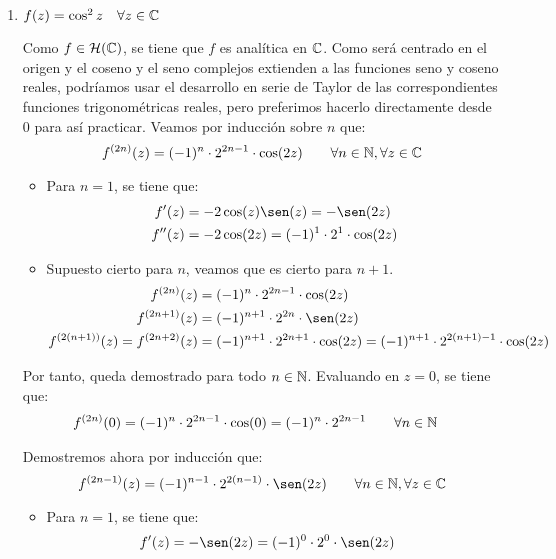 \begin{ejercicio}
\begin{enumerate}
        

        
        \item $f(z) = \cos^2 z \quad \forall z \in \mathbb{C}$
        
        Como $f\in \mathcal{H}(\mathbb{C})$, se tiene que $f$ es analítica en $\mathbb{C}$. Como será centrado en el origen y el coseno y el seno complejos extienden a las funciones seno y coseno reales, podríamos usar el desarrollo en serie de Taylor de las correspondientes funciones trigonométricas reales, pero preferimos hacerlo directamente desde $0$ para así practicar.        
        Veamos por inducción sobre $n$ que:
        \begin{equation*}
            f^{(2n)}(z) = (-1)^{n}\cdot 2^{2n-1}\cdot \cos(2z) \qquad \forall n \in \mathbb{N}, \forall z \in \mathbb{C}
        \end{equation*}
        \begin{itemize}
            \item Para $n=1$, se tiene que:
            \begin{align*}
                f'(z) &= -2\cos(z)\sen(z) = -\sen(2z)\\
                f''(z) &= -2\cos(2z) = (-1)^1\cdot 2^{1}\cdot \cos(2z)
            \end{align*}

            \item Supuesto cierto para $n$, veamos que es cierto para $n+1$.
            \begin{align*}
                f^{(2n)}(z) &= (-1)^{n}\cdot 2^{2n-1}\cdot \cos(2z)\\
                f^{(2n+1)}(z) &= (-1)^{n+1}\cdot 2^{2n}\cdot \sen(2z)\\
                f^{(2(n+1))}(z) = f^{(2n+2)}(z) &= (-1)^{n+1}\cdot 2^{2n+1}\cdot \cos(2z) = (-1)^{n+1}\cdot 2^{2(n+1)-1}\cdot \cos(2z)
            \end{align*}
        \end{itemize}

        Por tanto, queda demostrado para todo $n\in \mathbb{N}$. Evaluando en $z=0$, se tiene que:
        \begin{align*}
            f^{(2n)}(0) &= (-1)^{n}\cdot 2^{2n-1}\cdot \cos(0) = (-1)^{n}\cdot 2^{2n-1}\qquad \forall n \in \mathbb{N}
        \end{align*}

        Demostremos ahora por inducción que:
        \begin{equation*}
            f^{(2n-1)}(z) = (-1)^{n-1}\cdot 2^{2(n-1)}\cdot \sen(2z) \qquad \forall n \in \bb{N}, \forall z \in \bb{C}
        \end{equation*}
        \begin{itemize}
            \item Para $n=1$, se tiene que:
            \begin{align*}
                f'(z) &= -\sen(2z)=(-1)^0\cdot 2^0\cdot \sen(2z)
            \end{align*}


\end{itemize}
\end{enumerate}
\end{ejercicio}
